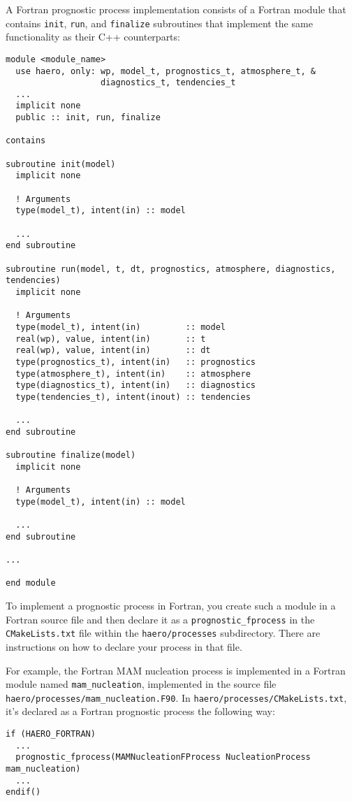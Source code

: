 A Fortran prognostic process implementation consists of a Fortran module that
contains \texttt{init}, \texttt{run}, and \texttt{finalize} subroutines that implement
the same functionality as their C++ counterparts:

\begin{lstlisting}
module <module_name>
  use haero, only: wp, model_t, prognostics_t, atmosphere_t, &
                   diagnostics_t, tendencies_t
  ...
  implicit none
  public :: init, run, finalize

contains

subroutine init(model)
  implicit none

  ! Arguments
  type(model_t), intent(in) :: model

  ...
end subroutine

subroutine run(model, t, dt, prognostics, atmosphere, diagnostics, tendencies)
  implicit none

  ! Arguments
  type(model_t), intent(in)         :: model
  real(wp), value, intent(in)       :: t
  real(wp), value, intent(in)       :: dt
  type(prognostics_t), intent(in)   :: prognostics
  type(atmosphere_t), intent(in)    :: atmosphere
  type(diagnostics_t), intent(in)   :: diagnostics
  type(tendencies_t), intent(inout) :: tendencies

  ...
end subroutine

subroutine finalize(model)
  implicit none

  ! Arguments
  type(model_t), intent(in) :: model

  ...
end subroutine

...

end module
\end{lstlisting}

To implement a prognostic process in Fortran, you create such a module in a
Fortran source file and then declare it as a \texttt{prognostic\_fprocess} in the
\texttt{CMakeLists.txt} file within the \texttt{haero/processes} subdirectory. There
are instructions on how to declare your process in that file.

For example, the Fortran MAM nucleation process is implemented in a Fortran
module named \texttt{mam\_nucleation}, implemented in the source file
\texttt{haero/processes/mam\_nucleation.F90}. In \texttt{haero/processes/CMakeLists.txt},
it's declared as a Fortran prognostic process the following way:

\begin{lstlisting}
if (HAERO_FORTRAN)
  ...
  prognostic_fprocess(MAMNucleationFProcess NucleationProcess mam_nucleation)
  ...
endif()
\end{lstlisting}

